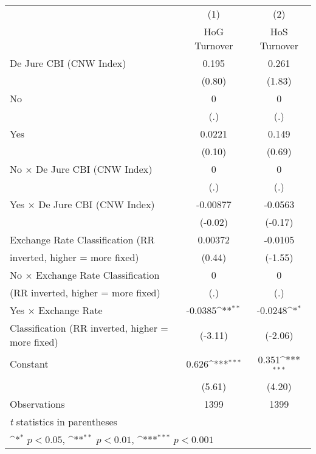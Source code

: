 \begin{table}[htbp]\centering
\def\sym#1{\ifmmode^{#1}\else\(^{#1}\)\fi}
\caption{\label{hoshogmultIndFEDJ}}
\begin{tabular}{l*{2}{c}}
\toprule
                                        &\multicolumn{1}{c}{(1)}&\multicolumn{1}{c}{(2)}\\
                                        &\multicolumn{1}{c}{HoG Turnover}&\multicolumn{1}{c}{HoS Turnover}\\
\midrule
De Jure CBI (CNW Index)                 &    0.195         &    0.261         \\
                                        &   (0.80)         &   (1.83)         \\
\addlinespace
No                                      &        0         &        0         \\
                                        &      (.)         &      (.)         \\
\addlinespace
Yes                                     &   0.0221         &    0.149         \\
                                        &   (0.10)         &   (0.69)         \\
\addlinespace
No $\times$ De Jure CBI (CNW Index)     &        0         &        0         \\
                                        &      (.)         &      (.)         \\
\addlinespace
Yes $\times$ De Jure CBI (CNW Index)    & -0.00877         &  -0.0563         \\
                                        &  (-0.02)         &  (-0.17)         \\
\addlinespace
Exchange Rate Classification (RR        &  0.00372         &  -0.0105         \\
inverted, higher = more fixed)          &   (0.44)         &  (-1.55)         \\
\addlinespace
No $\times$ Exchange Rate Classification&        0         &        0         \\
(RR inverted, higher = more fixed)      &      (.)         &      (.)         \\
\addlinespace
Yes $\times$ Exchange Rate              &  -0.0385\sym{**} &  -0.0248\sym{*}  \\
Classification (RR inverted, higher = more fixed)&  (-3.11)         &  (-2.06)         \\
\addlinespace
Constant                                &    0.626\sym{***}&    0.351\sym{***}\\
                                        &   (5.61)         &   (4.20)         \\
\midrule
Observations                            &     1399         &     1399         \\
\bottomrule
\multicolumn{3}{l}{\footnotesize \textit{t} statistics in parentheses}\\
\multicolumn{3}{l}{\footnotesize \sym{*} \(p<0.05\), \sym{**} \(p<0.01\), \sym{***} \(p<0.001\)}\\
\end{tabular}
\end{table}
